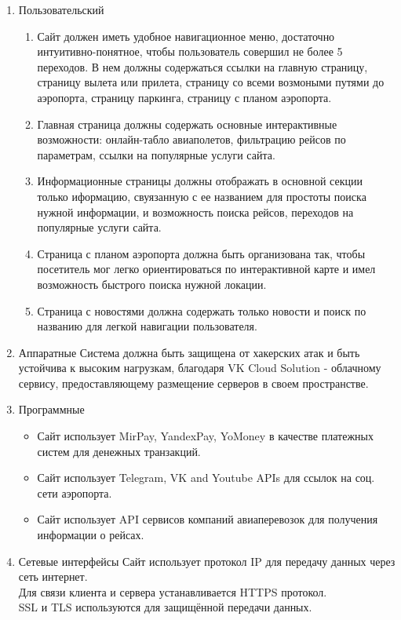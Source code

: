
\begin{enumerate}
    \item Пользовательский
          \begin{enumerate}
              \item Сайт должен иметь удобное навигационное меню,
                    достаточно интуитивно-понятное, чтобы пользователь совершил не более
                    5 переходов.
                    В нем должны содержаться ссылки на главную страницу, страницу вылета или прилета,
                    страницу со всеми возмоными путями до аэропорта,
                    страницу паркинга, страницу с планом аэропорта.
              \item Главная страница должны содержать основные интерактивные возможности:
                    онлайн-табло авиаполетов, фильтрацию рейсов по параметрам,
                    ссылки на популярные услуги сайта.
              \item Информационные страницы должны отображать в основной секции только иформацию,
                    свуязанную с ее названием для простоты поиска нужной информации,
                    и возможность поиска рейсов, переходов на популярные услуги сайта.
              \item Страница с планом аэропорта должна быть организована так, чтобы
                    посетитель мог легко ориентироваться по интерактивной карте и имел возможность
                    быстрого поиска нужной локации.
              \item Страница с новостями должна содержать только новости и
                    поиск по названию для легкой навигации пользователя.
          \end{enumerate}
    \item Аппаратные
          Система должна быть защищена от хакерских атак и быть устойчива к высоким нагрузкам, благодаря
          VK Cloud Solution - облачному сервису, предоставляющему размещение серверов в своем пространстве.
    \item Программные
          \begin{itemize}
              \item Сайт использует MirPay, YandexPay, YoMoney в качестве платежных систем для денежных транзакций.
              \item Сайт использует Telegram, VK and Youtube APIs для ссылок на соц. сети аэропорта.
              \item Сайт использует API сервисов компаний авиаперевозок для получения информации о рейсах.
          \end{itemize}
    \item Сетевые интерфейсы
          Сайт использует протокол IP для передачу данных через сеть интернет.
          \\
          Для связи клиента и сервера устанавливается HTTPS протокол.
          \\
          SSL и TLS используются для защищённой передачи данных.
\end{enumerate}